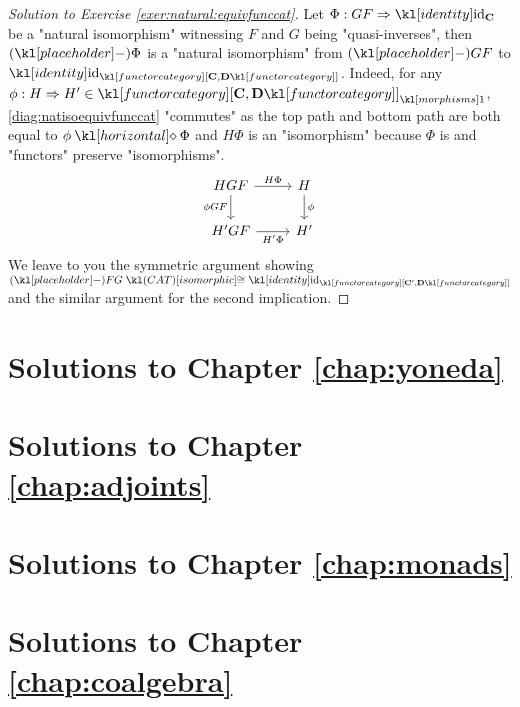 \documentclass[main.tex]{subfiles}
\begin{document}
\begin{proof}[Solution to Exercise \ref{exer:natural:equivfunccat}]
    Let $\Phi: GF \Rightarrow \id_{\mathbf{C}}$ be a "natural isomorphism" witnessing $F$ and $G$ being "quasi-inverses", then $(\placeholder)\Phi$ is a "natural isomorphism" from $(\placeholder)GF$ to $\id_{\catFunc{\mathbf{C}}{\mathbf{D}}}$. Indeed, for any $\phi: H \Rightarrow H' \in \mor{\catFunc{\mathbf{C}}{\mathbf{D}}}$, \eqref{diag:natisoequivfunccat} "commutes" as the top path and bottom path are both equal to $\phi \horcomp \Phi$ and $H\Phi$ is an "isomorphism" because $\Phi$ is and "functors" preserve "isomorphisms".
    \begin{equation}\label{diag:natisoequivfunccat}
        \begin{tikzcd}
            HGF & H \\
            {H'GF} & {H'}
            \arrow["{\phi GF}"', from=1-1, to=2-1]
            \arrow["H\Phi", from=1-1, to=1-2]
            \arrow["\phi", from=1-2, to=2-2]
            \arrow["{H'\Phi}"', from=2-1, to=2-2]
        \end{tikzcd}
    \end{equation}
    We leave to you the symmetric argument showing $(\placeholder)FG \isoCAT \id_{\catFunc{\mathbf{C}'}{\mathbf{D}}}$ and the similar argument for the second implication.
\end{proof}
\section{Solutions to Chapter \ref{chap:yoneda}}
\section{Solutions to Chapter \ref{chap:adjoints}}
\section{Solutions to Chapter \ref{chap:monads}}
\section{Solutions to Chapter \ref{chap:coalgebra}}
\end{document}
